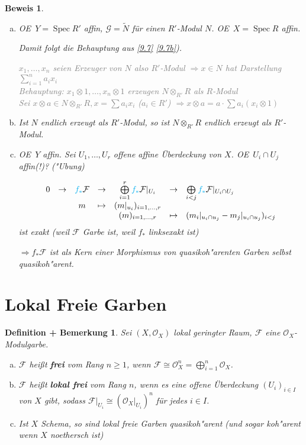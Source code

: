 \documentclass[paper = A4, fontsize=12pt, numbers=noendperiod, chapterprefix=true]{scrbook}
\theoremstyle{break}
\newtheorem{DefBem}[Def]{Definition + Bemerkung}
\theoremstyle{nonumberbreak}
\newtheorem{bew}{Beweis}
\theoremstyle{nonumberplain}
\newcommand{\emp}[1]{\textbf{\emph{#1}}}
\newcommand{\defterm}[1]{{\index{#1}}\emp{#1}}
\newcommand{\deftermspec}[2]{{\index{#2}}\emp{#1}}
\DeclareMathOperator{\Spec}{Spec}
\newcommand{\calF}{\mathcal{F}}
\newcommand{\calG}{\mathcal{G}}
\newcommand{\calO}{\mathcal{O}}
\renewcommand{\OE}{O\!\!E~}
\begin{document}
\begin{bew}\begin{enumerate}[a)]
\item
	\OE $Y = \Spec R'$ affin, $\calG = \tilde N$ f\"ur einen $R'$-Modul $N$. \OE $X = \Spec R$ affin.
	
	Damit folgt die Behauptung aus \ref{9.7} \ref{9.7b}).
	
	\textcolor{gray}{$x_1,\ldots ,x_n$ seien Erzeuger von $N$ also $R'$-Modul $\Rightarrow x \in N$ hat Darstellung $\sum\limits_{i=1}^n a_i x_i$\\
	\emph{Behauptung}: $x_1\otimes 1,\ldots ,x_n \otimes 1$ erzeugen $N \otimes_{R'} R$ als $R$-Modul\\
	Sei $x \otimes a \in N \otimes_{R'} R, x = \sum a_i x_i$ ($a_i \in R'$) $\Rightarrow x \otimes a = a \cdot \sum a_i (x_i \otimes 1)$}
\item
	Ist $N$ endlich erzeugt als $R'$-Modul, so ist $N \otimes_{R'} R$ endlich erzeugt als $R'$-Modul.
\item
	\OE $Y$ affin. Sei $U_1,\ldots ,U_r$ offene affine \"Uberdeckung von $X$. \OE $U_i \cap U_j$ affin(!)? ("Ubung)
	
	\[\begin{array}{ccccccl} 0 &\to& \textcolor{safe1}{f_*}\calF &\to& \bigoplus\limits_{i=1}^r \textcolor{safe1}{f_*}\calF|_{U_i} &\to& \bigoplus\limits_{i < j} \textcolor{safe1}{f_*}\calF|_{U_i \cap U_j} \\
		&& m &\mapsto& (m|_{u_i})_{i=1,\ldots ,r} && \\
		&&&& (m)_{i=1,\ldots ,r} &\mapsto& (m_i|_{u_i \cap u_j} - m_j|_{u_i \cap u_j})_{i<j}\end{array}\]
	ist exakt (weil $\calF$ Garbe ist, \textcolor{safe1}{weil $f_*$ linksexakt ist})
	
	$\Rightarrow f_*\calF$ ist als Kern einer Morphismus von quasikoh"arenten Garben selbst quasikoh"arent.
\end{enumerate}\end{bew}

\newpage

\section{Lokal Freie Garben}

\begin{DefBem}
Sei $(X, \calO_X)$ lokal geringter Raum, $\calF$ eine $\calO_X$-Modulgarbe.
\begin{enumerate}[a)]
\item
	$\calF$ hei\ss t \defterm{frei} vom Rang $n \ge 1$, wenn $\calF \cong \calO_X^n = \bigoplus\limits_{i=1}^n \calO_X$.
\item
	$\calF$ hei\ss t \deftermspec{lokal frei}{frei!lokal} vom Rang $n$, wenn es eine offene \"Uberdeckung $(U_i)_{i\in I}$ von $X$ gibt, sodass $\calF|_{U_i} \cong (\calO_X|_{U_i})^n$ f\"ur jedes $i \in I$.
\item
	Ist $X$ Schema, so sind lokal freie Garben quasikoh"arent (und sogar koh"arent wenn $X$ noethersch ist)
\end{enumerate}\end{DefBem}
\end{document}
